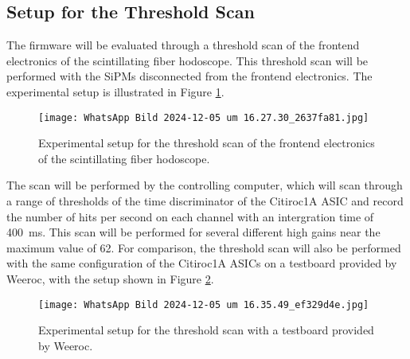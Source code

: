 \subsection{Setup for the Threshold Scan}
The firmware will be evaluated through a threshold scan of the frontend electronics of the scintillating fiber hodoscope. 
This threshold scan will be performed with the SiPMs disconnected from the frontend electronics. 
The experimental setup is illustrated in Figure \ref{fig:noise_setup}.
\begin{figure}[H]
    \centering
    \texttt{[image: WhatsApp Bild 2024-12-05 um 16.27.30\_2637fa81.jpg]}%
    \caption{Experimental setup for the threshold scan of the frontend electronics of the scintillating fiber hodoscope.}
    \label{fig:noise_setup}
\end{figure}
The scan will be performed by the controlling computer, 
which will scan through a range of thresholds of the time discriminator of the Citiroc1A ASIC and record the number of hits per second on each channel with an intergration time of \SI{400}{\milli\second}.
This scan will be performed for several different high gains near the maximum value of 62.
\newline
For comparison, the threshold scan will also be performed with the same configuration of the Citiroc1A ASICs on a testboard provided by Weeroc, 
with the setup shown in Figure \ref{fig:noise_setup_testboard}.
\begin{figure}[H]
    \centering
    \texttt{[image: WhatsApp Bild 2024-12-05 um 16.35.49\_ef329d4e.jpg]}%
    \caption{Experimental setup for the threshold scan with a testboard provided by Weeroc.}
    \label{fig:noise_setup_testboard}
\end{figure}

